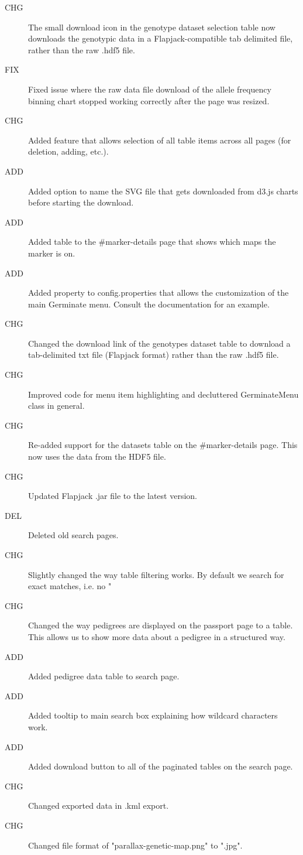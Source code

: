 \begin{description}
	\item[CHG]The small download icon in the genotype dataset selection table now downloads the genotypic data in a Flapjack-compatible tab delimited file, rather than the raw .hdf5 file.
	\item[FIX]Fixed issue where the raw data file download of the allele frequency binning chart stopped working correctly after the page was resized.
	\item[CHG]Added feature that allows selection of all table items across all pages (for deletion, adding, etc.).
	\item[ADD]Added option to name the SVG file that gets downloaded from d3.js charts before starting the download.
	\item[ADD]Added table to the \#marker-details page that shows which maps the marker is on.
	\item[ADD]Added property to config.properties that allows the customization of the main Germinate menu. Consult the documentation for an example.
	\item[CHG]Changed the download link of the genotypes dataset table to download a tab-delimited txt file (Flapjack format) rather than the raw .hdf5 file.
	\item[CHG]Improved code for menu item highlighting and decluttered GerminateMenu class in general.
	\item[CHG]Re-added support for the datasets table on the \#marker-details page. This now uses the data from the HDF5 file.
	\item[CHG]Updated Flapjack .jar file to the latest version.
	\item[DEL]Deleted old search pages.
	\item[CHG]Slightly changed the way table filtering works. By default we search for exact matches, i.e. no "%
	\item[CHG]Changed the way pedigrees are displayed on the passport page to a table. This allows us to show more data about a pedigree in a structured way.
	\item[ADD]Added pedigree data table to search page.
	\item[ADD]Added tooltip to main search box explaining how wildcard characters work.
	\item[ADD]Added download button to all of the paginated tables on the search page.
	\item[CHG]Changed exported data in .kml export.
	\item[CHG]Changed file format of "parallax-genetic-map.png" to ".jpg".

\end{description}
